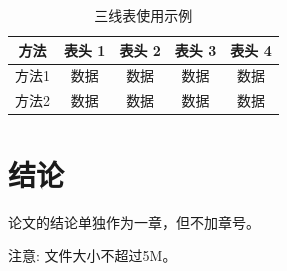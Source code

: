 \documentclass[zihao=-4]{ctexart}
\begin{document}
\begin{spacing}{1.5}
\begin{table}[H]
\begin{tabular}{|l||c|c|c|c|c|c|}
\end{tabular}
\end{table}


\begin{table}[H]
\caption{三线表使用示例}
\centering
\begin{tabular}{ccccc}
\hline  
\textbf{方法} & \textbf{表头 1} & \textbf{表头 2} & \textbf{表头 3} & \textbf{表头 4} \\ 
\hline  
方法1 & 数据  & 数据  & 数据  & 数据\\
方法2 & 数据  & 数据  & 数据  & 数据\\
\hline
\end{tabular} 
\end{table} 

\section*{结论}%
论文的结论单独作为一章，但不加章号。

注意: 文件大小不超过5M。

\end{spacing}

\newpage











% 



\end{document}
